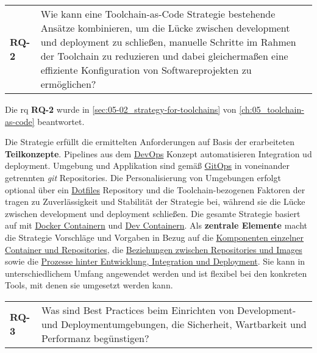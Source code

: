\vspace{1em}
\begin{table}[H]
    \centering
    \begin{tabular}{p{} p{}}
        \textbf{RQ-2} & Wie kann eine Toolchain-as-Code Strategie bestehende Ansätze kombinieren, um die Lücke zwischen \Gls{development} und \Gls{deployment} zu schließen, manuelle Schritte im Rahmen der Toolchain zu reduzieren und dabei gleichermaßen eine effiziente Konfiguration von Softwareprojekten zu ermöglichen?
    \end{tabular}
\end{table}

Die \acrlong{rq} \textbf{RQ-2} wurde in \autoref{sec:05-02_strategy-for-toolchains} von \autoref{ch:05_toolchain-as-code} beantwortet.

Die  Strategie erfüllt die ermittelten Anforderungen auf Basis der erarbeiteten \textbf{Teilkonzepte}. Pipelines aus dem \hyperref[sec:03-01_devops]{DevOps} Konzept automatisieren Integration ud \Gls{deployment}. Umgebung und Applikation sind gemäß \hyperref[sec:03-03_gitops]{GitOps} in voneinander getrennten \textit{\Gls{git}} Repositories. Die Personalisierung von Umgebungen erfolgt optional über ein \hyperref[sec:03-04_dotfiles]{Dotfiles} Repository und die Toolchain-bezogenen Faktoren der  tragen zu Zuverlässigkeit und Stabilität der Strategie bei, während sie die Lücke zwischen \Gls{development} und \Gls{deployment} schließen. Die gesamte Strategie basiert auf \textbf{} mit \hyperref[subsec:05-01-01_docker-container]{Docker Containern} und \hyperref[subsec:05-01-02_dev-container]{Dev Containern}. Als \textbf{zentrale Elemente} macht die Strategie Vorschläge und Vorgaben in Bezug auf die \hyperref[subsubsec:05-02-02-02_sub-components-in-environments]{Komponenten einzelner Container und Repositories}, die \hyperref[subsubsec:05-02-02-01_data-storage-in-repositories]{Beziehungen zwischen Repositories und Images} sowie die \hyperref[subsec:05-02-03_workflows-and-continuity-in-the-toolchain-as-code-approach]{Prozesse hinter Entwicklung, Integration und Deployment}. Sie kann in unterschiedlichem Umfang angewendet werden und ist flexibel bei den konkreten Tools, mit denen sie umgesetzt werden kann.

\vspace{1em}
\begin{table}[H]
    \centering
    \begin{tabular}{p{} p{}}
        \textbf{RQ-3} & Was sind Best Practices beim Einrichten von Development- und Deploymentumgebungen, die Sicherheit, Wartbarkeit und Performanz begünstigen? \\
    \end{tabular}
\end{table}

